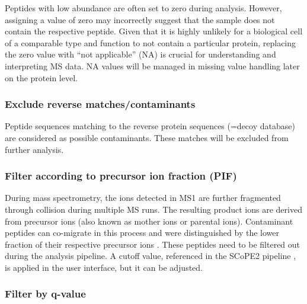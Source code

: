 \documentclass[
  11pt,
]{article}
\begin{document}
Peptides with low abundance are often set to zero during analysis. However, assigning a value of zero may incorrectly suggest that the sample does not contain the respective peptide. Given that it is highly unlikely for a biological cell of a comparable type and function to not contain a particular protein, replacing the zero value with ``not applicable'' (NA) is crucial for understanding and interpreting MS data. NA values will be managed in missing value handling later on the protein level.

\hypertarget{exclude-reverse-matchescontaminants}{%
\subsubsection{Exclude reverse matches/contaminants}\label{exclude-reverse-matchescontaminants}}

Peptide sequences matching to the reverse protein sequences (=decoy database) are considered as possible contaminants. These matches will be excluded from further analysis.

\hypertarget{filter-according-to-precursor-ion-fraction-pif}{%
\subsubsection{Filter according to precursor ion fraction (PIF)}\label{filter-according-to-precursor-ion-fraction-pif}}

During mass spectrometry, the ions detected in MS1 are further fragmented through collision during multiple MS runs. The resulting product ions are derived from precursor ions (also known as mother ions or parental ions). Contaminant peptides can co-migrate in this process and were distinguished by the lower fraction of their respective precursor ions \citep{Tannous2020}. These peptides need to be filtered out during the analysis pipeline. A cutoff value, referenced in the SCoPE2 pipeline \citep{Specht2021}, is applied in the user interface, but it can be adjusted.

\hypertarget{filter-by-q-value}{%
\subsubsection{Filter by q-value}\label{filter-by-q-value}}
\end{document}
